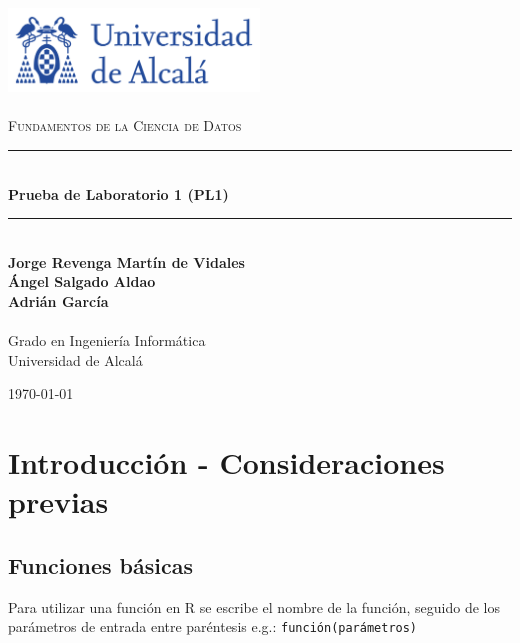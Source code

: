 \documentclass[a4paper, 12pt]{article}
\newcommand{\HRule}{\rule{\linewidth}{0.5mm}}
\begin{document}
	\begin{titlepage}
		\begin{center}
			\includegraphics[width=0.5\textwidth]{logoUAH.png}~\\[2cm]
			
			\textsc{\Large \\Fundamentos de la Ciencia de Datos}\\[2cm]
			
			\HRule \\[0.4cm]
			{\LARGE \bfseries Prueba de Laboratorio 1 (PL1) \\[0.4cm]}
			\HRule \\[2cm]
			
			\large\textbf{Jorge Revenga Martín de Vidales}\\
			\large\textbf{Ángel Salgado Aldao}\\
			\large\textbf{Adrián García}\\
			\large\textbf{}\\ Grado en Ingeniería Informática \\ Universidad de Alcalá
			
			\vfill
			
			{\large \today}
		\end{center}
	\end{titlepage}
	\pagestyle{fancy}
	\fancyhf{} %
	\fancyfoot[RO,LE]{\thepage}  %
	\newpage
	
	\thispagestyle{plain}
	\tableofcontents
	
	
	\newpage
	\section{Introducción - Consideraciones previas}
	\subsection{Funciones básicas}
	Para utilizar una función en R se escribe el nombre de la función, seguido de los parámetros de entrada entre paréntesis e.g.: \texttt{función(parámetros)}
	
\end{document}
